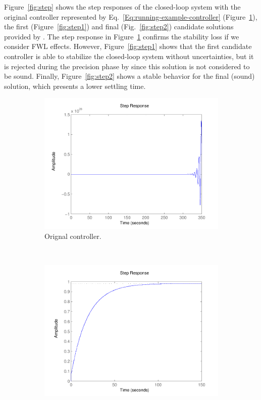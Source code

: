 \documentclass{sig-alternate-05-2015}
\begin{document}
%
Figure~\ref{fig:step} shows the step responses of the closed-loop system 
with the original controller represented by Eq.~\eqref{Eq:running-example-controller} (Figure~\ref{fig:step0}), 
the first (Figure~\ref{fig:step1}) and final (Fig.~\ref{fig:step2}) candidate solutions provided by \tool. 
The step response in Figure~\ref{fig:step0} confirms the stability loss if we consider FWL effects. 
However, Figure~\ref{fig:step1} shows that the first candidate controller is able to stabilize 
the closed-loop system without uncertainties, but it is rejected during the {\sc precision} phase by 
\tool since this solution is not considered to be sound. Finally, Figure~\ref{fig:step2} 
shows a stable behavior for the final (sound) solution, which presents a lower settling time.
%
\begin{figure}
    \centering
    \begin{subfigure}[b]{0.3\textwidth}
        \includegraphics[width=\textwidth]{figures/runningexample_step0.pdf}
        \caption{Orignal controller.}
        \label{fig:step0}
    \end{subfigure}
    ~
    \begin{subfigure}[b]{0.3\textwidth}
        \includegraphics[width=\textwidth]{figures/runningexample_step1.pdf}

\end{subfigure}
\end{figure}
\end{document}
